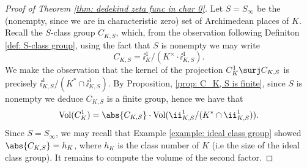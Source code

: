 \documentclass[11pt, x11names, openany]{book}
\begin{document}
\begin{proof}[Proof of Theorem \ref{thm: dedekind zeta func in char 0}]
Let $S = S_\infty$ be the (nonempty, since we are in characteristic zero) set of Archimedean places of $K$. Recall the $S$-class group $C_{K, S}$, which, from the observation following Definiton \ref{def: S-class group}, using the fact that $S$ is nonempty we may write 
\begin{equation*}
    C_{K, S} = \ii^1_K/(K^\times \cdot \ii^1_{K, S}).
\end{equation*}
 We make the observation that the kernel of the projection $C^1_K \surj C_{K, S}$ is precisely $\ii^1_{K, S}/(K^* \cap \ii^1_{K, S})$. By Proposition, \ref{prop: C_K, S is finite}, since $S$ is nonempty we deduce $C_{K, S}$ is a finite group, hence we have that
 \begin{equation}
    \label{eqn: C^1_K vol computation}
    \vol(C^1_K) = \abs{C_{K, S}} \cdot \vol(\ii^1_{K, S}/(K^* \cap \ii^1_{K, S})).
 \end{equation}
Since $S = S_\infty$, we may recall that Example \ref{example: ideal class group} showed $\abs{C_{K, S}} = h_K$, where $h_K$ is the class number of $K$ (i.e the size of the ideal class group). It remains to compute the volume of the second factor.


\end{proof}
\end{document}
